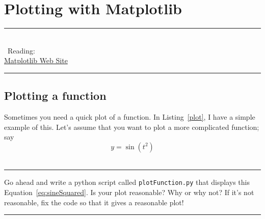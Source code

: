 \chapter{Plotting with Matplotlib}
\label{ch:matplotlib} 

\begin{flushright}
	\parbox{8cm}
		{
		\begin{flushright}
		\rule{8cm}{0.5pt}\\
		\vspace*{5mm}
		\sffamily \
		Reading:\\
		\href{http://matplotlib.sourceforge.net/}{Matplotlib Web Site}
		
		\vspace*{5mm}
		\rule{8cm}{0.5pt}
		\end{flushright}
		}
\end{flushright}


\section{Plotting a function}\label{sec:functionPlot}
Sometimes you need a quick plot of a function. In Listing~\ref{plot}, I have a simple example of this. Let's assume that you want to plot a more complicated function; say 
\begin{equation} y = \sin(t^2) \label{eq:sineSquared}\end{equation}
\\
\rule{\textwidth}{1pt}
\begin{exercise}\label{exer:plotFuncSineSquared}
Go ahead and write a python script called \verb!plotFunction.py! that displays this Equation~\ref{eq:sineSquared}. Is your plot reasonable? Why or why not? If it's not reasonable, fix the code so that it gives a reasonable plot!
\end{exercise}
\rule{\textwidth}{1pt}

